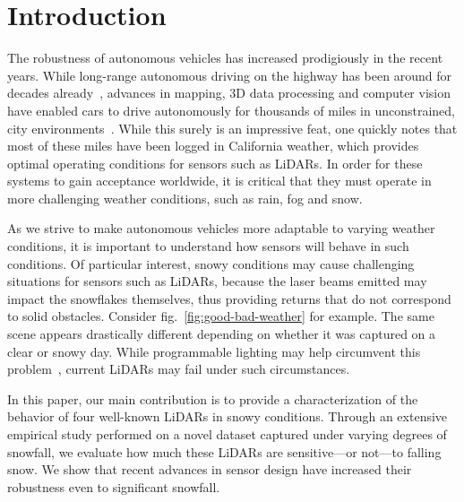 \section{Introduction}

The robustness of autonomous vehicles has increased prodigiously in the recent years. While long-range autonomous driving on the highway has been around for decades already~\cite{Pomerleau_1996_616}, advances in mapping, 3D data processing and computer vision have enabled cars to drive autonomously for thousands of miles in unconstrained, city environments~\cite{urmson2008autonomous}. While this surely is an impressive feat, one quickly notes that most of these miles have been logged in California weather, which provides optimal operating conditions for sensors such as LiDARs. In order for these systems to gain acceptance worldwide, it is critical that they must operate in more challenging weather conditions, such as rain, fog and snow. 

As we strive to make autonomous vehicles more adaptable to varying weather conditions, it is important to understand how sensors will behave in such conditions. Of particular interest, snowy conditions may cause challenging situations for sensors such as LiDARs, because the laser beams emitted may impact the snowflakes themselves, thus providing returns that do not correspond to solid obstacles. Consider fig.~\ref{fig:good-bad-weather} for example. The same scene appears drastically different depending on whether it was captured on a clear or snowy day. While programmable lighting may help circumvent this problem~\cite{tamburo2014programmable}, current LiDARs may fail under such circumstances. 

In this paper, our main contribution is to provide a characterization of the behavior of four well-known LiDARs in snowy conditions. Through an extensive empirical study performed on a novel dataset captured under varying degrees of snowfall, we evaluate how much these LiDARs are sensitive---or not---to falling snow. We show that recent advances in sensor design have increased their robustness even to significant snowfall. 

